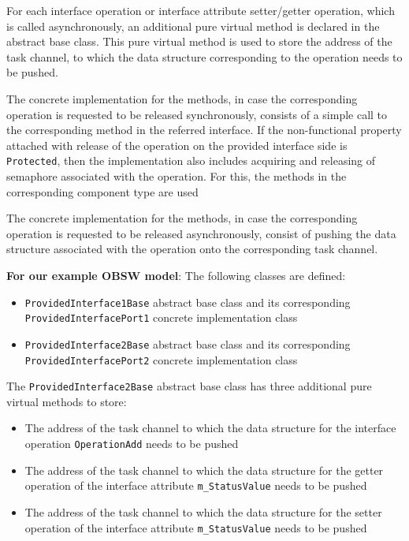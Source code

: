 For each interface operation or interface attribute setter/getter operation, which is called asynchronously, an additional pure virtual method is declared in the abstract base class. This pure virtual method is used to store the address of the task channel, to which the data structure corresponding to the operation needs to be pushed.

The concrete implementation for the methods, in case the corresponding operation is requested to be released synchronously, consists of a simple call to the corresponding method in the referred interface. If the non-functional property attached with release of the operation on the provided interface side is \texttt{Protected}, then the implementation also includes acquiring and releasing of semaphore associated with the operation. For this, the methods in the corresponding component type are used 

The concrete implementation for the methods, in case the corresponding operation is requested to be released asynchronously, consist of pushing the data structure associated with the operation onto the corresponding task channel. 

\textbf{For our example OBSW model}: The following classes are defined:
\begin{itemize}
\item \texttt{Provided\allowbreak Interface1\allowbreak Base} abstract base class and its corresponding \texttt{Provided\allowbreak Interface\allowbreak Port1} concrete implementation class
\item \texttt{Provided\allowbreak Interface2\allowbreak Base} abstract base class and its corresponding \texttt{Provided\allowbreak Interface\allowbreak Port2} concrete implementation class
\end{itemize} 

The \texttt{Provided\allowbreak Interface2\allowbreak Base} abstract base class has three additional pure virtual methods to store:
\begin{itemize}
\item The address of the task channel to which the data structure for the interface operation \texttt{OperationAdd} needs to be pushed
\item The address of the task channel to which the data structure for the getter operation of the interface attribute \texttt{m\_StatusValue} needs to be pushed
\item The address of the task channel to which the data structure for the setter operation of the interface attribute \texttt{m\_StatusValue} needs to be pushed
\end{itemize}

